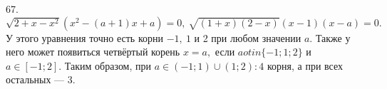 67. $\sqrt{2+x-x^2}(x^2-(a+1)x+a)=0,\ \sqrt{(1+x)(2-x)}(x-1)(x-a)=0.$ У этого уравнения точно есть корни $-1,\ 1$ и 2 при любом значении $a.$ Также у него
может появиться четвёртый корень $x=a,$ если $a
otin\{-1;1;2\}$ и $a\in[-1;2].$ Таким образом, при $a\in(-1;1)\cup(1;2): 4$ корня, а при всех остальных --- 3.\\
